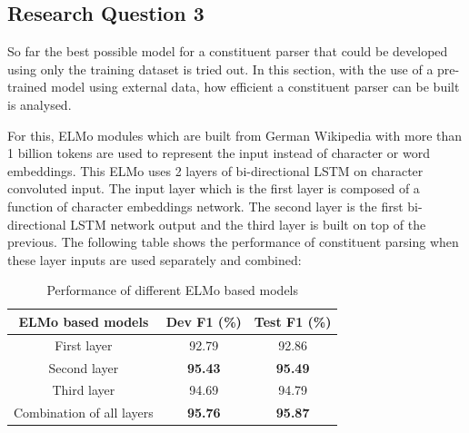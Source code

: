 \documentclass[a4paper, 11pt]{article}
\begin{document}


\pagebreak
\subsection{Research Question 3}
So far the best possible model for a constituent parser that could be developed using only the training dataset is tried out. In this section, with the use of a pre-trained model using external data, how efficient a constituent parser can be built is analysed.

For this, ELMo modules which are built from German Wikipedia with more than 1 billion tokens are used to represent the input instead of character or word embeddings. This ELMo uses 2 layers of bi-directional LSTM on character convoluted input. The input layer which is the first layer is composed of a function of character embeddings network. The second layer is the first bi-directional LSTM network output and the third layer is built on top of the previous. The following table shows the performance of constituent parsing when these layer inputs are used separately and combined:

\begin{table}[h!]
  \begin{center}
    \label{tab:different-elmo-models}
    \def\arraystretch{1.5}%
    \begin{tabular}{c|c|c}
      ELMo based models & Dev F1 (\%) & Test F1 (\%) \\
      \hline
	  First layer & 92.79 & 92.86\\
      Second layer  & \textbf{95.43} & \textbf{95.49}\\
      Third layer & 94.69 & 94.79\\
      Combination of all layers & \textbf{95.76} & \textbf{95.87}\\     
    \end{tabular}
    \caption{Performance of different ELMo based models}
  \end{center}
\end{table}
\end{document}
